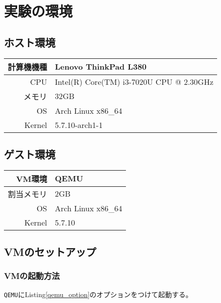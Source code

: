 \documentclass[main]{subfiles}
\begin{document}
\section{実験の環境}

\subsection{ホスト環境}

\begin{table}[]
\begin{tabular}{|r|l|}
\hline
計算機機種  & Lenovo ThinkPad L380                     \\ \hline
CPU    & Intel(R) Core(TM) i3-7020U CPU @ 2.30GHz \\ \hline
メモリ    & 32GB                                     \\ \hline
OS     & Arch Linux x86\_64                       \\ \hline
Kernel & 5.7.10-arch1-1                           \\ \hline
\end{tabular}
\end{table}

\subsection{ゲスト環境}

\begin{table}[]
\begin{tabular}{|r|l|}
\hline
VM環境   & QEMU               \\ \hline
割当メモリ  & 2GB                \\ \hline
OS     & Arch Linux x86\_64 \\ \hline
Kernel & 5.7.10             \\ \hline
\end{tabular}
\end{table}

\subsection{VMのセットアップ}

\subsubsection{VMの起動方法}
\label{how_to_vm_boot}

\texttt{QEMU}にListing\ref{qemu_option}のオプションをつけて起動する。
\end{document}
